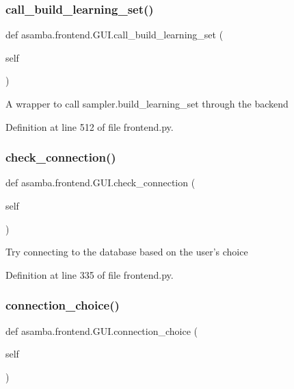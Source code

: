 \subsubsection{\texorpdfstring{call\+\_\+build\+\_\+learning\+\_\+set()}{call\_build\_learning\_set()}}
{\footnotesize\ttfamily def asamba.\+frontend.\+G\+U\+I.\+call\+\_\+build\+\_\+learning\+\_\+set (\begin{DoxyParamCaption}\item[{}]{self }\end{DoxyParamCaption})}

\begin{DoxyVerb}A wrapper to call sampler.build_learning_set through the backend \end{DoxyVerb}
 

Definition at line 512 of file frontend.\+py.

\mbox{\label{classasamba_1_1frontend_1_1_g_u_i_aacca71c626bd1753c1277e13b5ad8eec}} 
\subsubsection{\texorpdfstring{check\+\_\+connection()}{check\_connection()}}
{\footnotesize\ttfamily def asamba.\+frontend.\+G\+U\+I.\+check\+\_\+connection (\begin{DoxyParamCaption}\item[{}]{self }\end{DoxyParamCaption})}

\begin{DoxyVerb}Try connecting to the database based on the user's choice \end{DoxyVerb}
 

Definition at line 335 of file frontend.\+py.

\mbox{\label{classasamba_1_1frontend_1_1_g_u_i_a4c88f62e31fe47af19c81215df643945}} 
\subsubsection{\texorpdfstring{connection\+\_\+choice()}{connection\_choice()}}
{\footnotesize\ttfamily def asamba.\+frontend.\+G\+U\+I.\+connection\+\_\+choice (\begin{DoxyParamCaption}\item[{}]{self }\end{DoxyParamCaption})}

